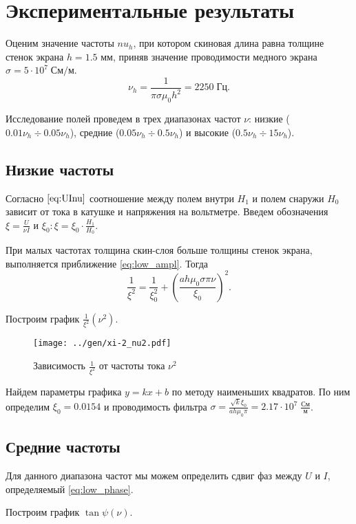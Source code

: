 \section*{Экспериментальные результаты}

Оценим значение частоты $nu_h$, при котором скиновая длина равна толщине стенок экрана $h = 1.5$ мм, приняв значение проводимости медного экрана $\sigma = 5 \cdot 10^7 \; \text{См}/\text{м}$.
$$ \nu_h = \frac{1}{\pi \sigma \mu_0 h^2} = 2250 \; \text{Гц}. $$ 

Исследование полей проведем в трех диапазонах частот $\nu$: низкие ($0.01 \nu_h \div 0.05 \nu_h$), средние ($0.05 \nu_h \div 0.5 \nu_h$) и высокие ($0.5 \nu_h \div 15 \nu_h$).

\subsection*{Низкие частоты}

Согласно $\ref{eq:UInu}$ соотношение между полем внутри $H_1$ и полем снаружи $H_0$ зависит от тока в катушке и напряжения на вольтметре. Введем обозначения $\xi = \frac{U}{\nu I}$ и $\xi_0: \xi = \xi_0 \cdot \frac{H_1}{H_0}$. 

При малых частотах толщина скин-слоя больше толщины стенок экрана, выполняется приближение \ref{eq:low_ampl}. Тогда
$$\frac{1}{\xi^2} = \frac{1}{\xi_0^2} + \left(\frac{ah\mu_0 \sigma \pi \nu}{\xi_0}\right)^2.$$

Построим график $\frac{1}{\xi^2}(\nu^2)$.

\begin{figure}[H]
	\centering
	\texttt{[image: ../gen/xi-2\_nu2.pdf]}
	\caption{Зависимость $\frac{1}{\xi^2}$ от частоты тока $\nu^2$}
	\label{fig:xi-2_nu2}
\end{figure}

Найдем параметры графика $y = kx + b$ по методу наименьших квадратов. По ним определим $\xi_0 = 0.0154$ и проводимость фильтра $\sigma = \frac{\sqrt{k} \xi_0}{a h \mu_0 \pi} = 2.17 \cdot 10^7 \; \frac{\text{См}}{\text{м}}$.

\subsection*{Средние частоты}

Для данного диапазона частот мы можем определить сдвиг фаз между $U$ и $I$, определяемый \ref{eq:low_phase}. 

Построим график $\tan \psi (\nu)$.

